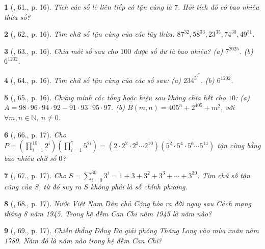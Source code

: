 \documentclass{article}
\newtheorem{baitoan}{}
\begin{document}
\begin{baitoan}[\cite{Tuyen_Toan_6}, 61., p. 16]
	Tích các số lẻ liên tiếp có tận cùng là $7$. Hỏi tích đó có bao nhiêu thừa số?
\end{baitoan}

\begin{baitoan}[\cite{Tuyen_Toan_6}, 62., p. 16]
	Tìm chữ số tận cùng của các lũy thừa: $87^{32},58^{33},23^{35},74^{30},49^{31}$.
\end{baitoan}

\begin{baitoan}[\cite{Tuyen_Toan_6}, 63., p. 16]
	Chia mỗi số sau cho $100$ được số dư là bao nhiêu? (a) $7^{2025}$. (b) $6^{1202}$.
\end{baitoan}

\begin{baitoan}[\cite{Tuyen_Toan_6}, 64., p. 16]
	Tìm chữ số tận cùng của các số sau: (a) $234^{5^{6^7}}$. (b) $6^{1202}$.
\end{baitoan}

\begin{baitoan}[\cite{Tuyen_Toan_6}, 65., p. 16]
	Chứng minh các tổng hoặc hiệu sau không chia hết cho $10$: (a) $A = 98\cdot96\cdot94\cdot92 - 91\cdot93\cdot95\cdot97$. (b) $B(m,n) = 405^n + 2^{405} + m^2$, với $\forall m,n\in\mathbb{N}$, $n\ne0$.
\end{baitoan}

\begin{baitoan}[\cite{Tuyen_Toan_6}, 66., p. 17]
	Cho $P = \left(\prod_{i=1}^{10} 2^i\right)\left(\prod_{i=1}^7 5^{2i}\right) = (2\cdot2^2\cdot2^3\cdots2^{10})(5^2\cdot5^4\cdot5^6\cdots5^{14})$ tận cùng bằng bao nhiêu chữ số $0$?
\end{baitoan}

\begin{baitoan}[\cite{Tuyen_Toan_6}, 67., p. 17]
	Cho $S = \sum_{i=0}^{30} 3^i = 1 + 3 + 3^2 + 3^3 + \cdots + 3^{30}$. Tìm chữ số tận cùng của $S$, từ đó suy ra $S$ không phải là số chính phương.
\end{baitoan}

\begin{baitoan}[\cite{Tuyen_Toan_6}, 68., p. 17]
	Nước Việt Nam Dân chủ Cộng hòa ra đời ngay sau Cách mạng tháng 8 năm 1945. Trong hệ đếm Can Chi năm 1945 là năm nào?
\end{baitoan}

\begin{baitoan}[\cite{Tuyen_Toan_6}, 69., p. 17]
	Chiến thắng Đống Đa giải phóng Thăng Long vào mùa xuân năm 1789. Năm đó là năm nào trong hệ đếm Can Chi?
\end{baitoan}
\end{document}
